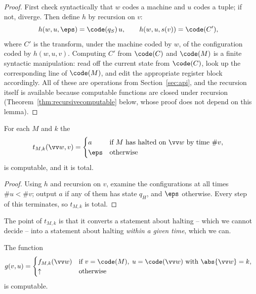 \begin{proof}
	First check syntactically that $w$ codes a machine and $u$ codes a tuple; if not, diverge. Then define $h$ by recursion on $v$:
	$$h(w,u,\eps) = \code(q_S)\,u, \qquad h(w,u,s(v)) = \code(C'),$$
	where $C'$ is the transform, under the machine coded by $w$, of the configuration coded by $h(w,u,v)$. Computing $C'$ from $\code(C)$ and $\code(M)$ is a finite syntactic manipulation: read off the current state from $\code(C)$, look up the corresponding line of $\code(M)$, and edit the appropriate register block accordingly. All of these are operations from Section~\ref{sec:api}, and the recursion itself is available because computable functions are closed under recursion (Theorem~\ref{thm:recursivecomputable} below, whose proof does not depend on this lemma).
\end{proof}

\begin{corollary}\label{cor:truncated}
	For each $M$ and $k$ the 
	$$t_{M,k}(\vv w, v) = \begin{cases} a & \text{if } M \text{ has halted on } \vv w \text{ by time } \#v, \\ \eps & \text{otherwise}\end{cases}$$
	is computable, and it is total.
\end{corollary}

\begin{proof}
	Using $h$ and recursion on $v$, examine the configurations at all times $\#u < \#v$; output $a$ if any of them has state $q_H$, and $\eps$ otherwise. Every step of this terminates, so $t_{M,k}$ is total.
\end{proof}

The point of $t_{M,k}$ is that it converts a statement about halting -- which we cannot decide -- into a statement about halting \emph{within a given time}, which we can.

\begin{theorem}\label{thm:software}
	The function
	$$g(v,u) = \begin{cases} f_{M,k}(\vv w) & \text{if } v = \code(M),\; u = \code(\vv w) \text{ with } \abs{\vv w} = k, \\ \uparrow & \text{otherwise}\end{cases}$$
	is computable.
\end{theorem}

